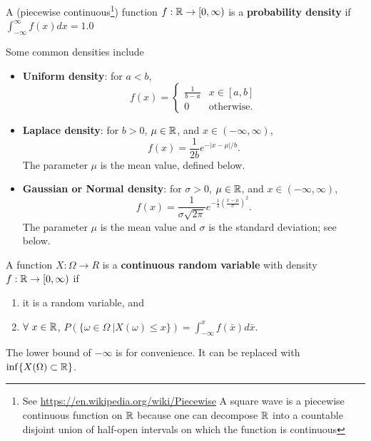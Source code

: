 
\begin{definition} A (piecewise continuous\footnote{See \url{https://en.wikipedia.org/wiki/Piecewise} A square wave is a piecewise continuous function on $\mathbb R$ because one can decompose $\mathbb R$ into a countable disjoint union of half-open intervals on which the function is continuous}) function $f:\mathbb R \to [0, \infty)$ is a \textbf{probability density} if $\int_{-\infty}^\infty f(x) dx = 1.0$
\end{definition}

\begin{example} Some common densities include
\begin{itemize}
    \item \textbf{Uniform density}: for $a < b$,  $$f(x) = \begin{cases} \frac{1}{b -a} & x \in [a, b] \\ 0 & \text{otherwise}. \end{cases}$$
    \item \textbf{Laplace density}: for $b>0$, $\mu \in \mathbb R$, and $x \in (-\infty, \infty)$,
    $$f(x) = \frac{1}{2b} e^{-|x - \mu|/b}.$$
    The parameter $\mu$
 is the mean value, defined below.
 \item \textbf{Gaussian or Normal density}:  for $\sigma>0$, $\mu \in \mathbb R$, and $x \in  (-\infty , \infty)$, 
 $$f(x) = \frac{1}{\sigma \sqrt{2 \pi}} e^{-\frac{1}{2} \left( \frac{x - \mu}{\sigma} \right)^2 }.$$ The parameter $\mu$ is the mean value and $\sigma$ is the standard deviation; see below.
 \end{itemize}

\end{example}


\begin{definition} A function $X: \Omega \to R$ is a \textbf{continuous random variable} with density $f:\mathbb R \to [0, \infty)$ if 
\begin{enumerate}
\setlength{\itemsep}{.2cm}
\renewcommand{\labelenumi}{(\alph{enumi})}
\item it is a random variable, and 
\item $\forall ~x \in \mathbb R$, 
$P(\{\omega \in \Omega~| X(\omega) \le x\})= \int_{-\infty}^x f(\bar{x}) d \bar{x}$.
\end{enumerate}
The lower bound of $-\infty$ is for convenience. It can be replaced with $\inf \{X(\Omega) \subset \mathbb R\}$.
\end{definition}

